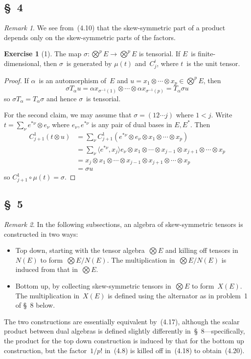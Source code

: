 \documentclass[letterpaper,12pt]{article}
\newcommand{\after}{\circ}
\newcommand{\tprod}{\otimes}
\newcommand{\bigtprod}{\bigotimes}
\newcommand{\medtprod}{{\textstyle\bigtprod}}
\newcommand{\sprod}[2]{\langle#1,#2\rangle}
\newcommand{\multi}[4]{#2_{#3}#1\cdots#1#2_{#4}}
\newcommand{\tprods}[3]{\multi{\tprod}{#1}{#2}{#3}}
\theoremstyle{definition}
\newtheorem*{exer}{Exercise}
\theoremstyle{remark}
\newtheorem*{rmk}{Remark}
\begin{document}
\subsection*{\S~4}
\begin{rmk}
We see from~(4.10) that the skew-symmetric part of a product depends only on the skew-symmetric parts of the factors.
\end{rmk}

\begin{exer}[1]
The map \(\sigma:\medtprod^p E\to\medtprod^p E\) is tensorial. If \(E\)~is finite-dimensional, then \(\sigma\)~is generated by \(\mu(t)\) and~\(C^i_j\), where \(t\)~is the unit tensor.
\end{exer}
\begin{proof}
If \(\alpha\)~is an automorphism of~\(E\) and \(u=\tprods{x}{1}{p}\in\medtprod^p E\), then
\[\sigma T_{\alpha}u=\tprods{\alpha x}{\sigma^{-1}(1)}{\sigma^{-1}(p)}=T_{\alpha}\sigma u\]
so \(\sigma T_{\alpha}=T_{\alpha}\sigma\) and hence \(\sigma\)~is tensorial.

For the second claim, we may assume that \(\sigma=(12\cdots j)\) where \(1<j\). Write \(t=\sum_{\nu}e^{*\nu}\tprod e_{\nu}\) where \(e_{\nu},e^{*\nu}\) is any pair of dual bases in \(E,E^*\). Then
\begin{align*}
C^1_{j+1}(t\tprod u)&=\sum_{\nu}C^1_{j+1}(e^{*\nu}\tprod e_{\nu}\tprod\tprods{x}{1}{p})\\
	&=\sum_{\nu}\sprod{e^{*\nu}}{x_j}e_{\nu}\tprod\tprods{x}{1}{j-1}\tprod\tprods{x}{j+1}{p}\\
	&=x_j\tprod\tprods{x}{1}{j-1}\tprod\tprods{x}{j+1}{p}\\
	&=\sigma u
\end{align*}
so \(C^1_{j+1}\after\mu(t)=\sigma\).
\end{proof}

\subsection*{\S~5}
\begin{rmk}
In the following subsections, an algebra of skew-symmetric tensors is constructed in two ways:
\begin{itemize}
\item Top down, starting with the tensor algebra~\(\medtprod E\) and killing off tensors in~\(N(E)\) to form~\(\medtprod E/N(E)\). The multiplication in~\(\medtprod E/N(E)\) is induced from that in~\(\medtprod E\).
\item Bottom up, by collecting skew-symmetric tensors in~\(\medtprod E\) to form~\(X(E)\). The multiplication in~\(X(E)\) is defined using the alternator as in problem~1 of \S~8 below.
\end{itemize}
The two constructions are essentially equivalent by~(4.17), although the scalar product between dual algebras is defined slightly differently in~\S~8---specifically, the product for the top down construction is induced by that for the bottom up construction, but the factor~\(1/p!\) in~(4.8) is killed off in~(4.18) to obtain~(4.20).
\end{rmk}
\end{document}
